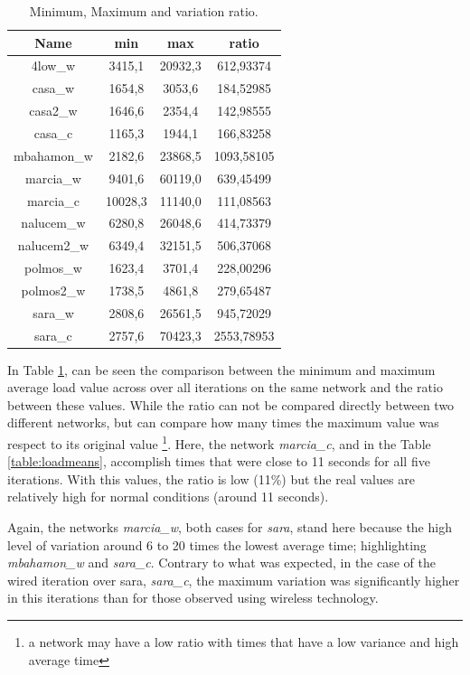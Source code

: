 \begin{table}[ht]
\begin{center}
\begin{tabular}{|c||c|c|c||}
 \hline
Name 			& min		& max		& ratio  	\\ \hline \hline
4low\_w 		& 3415,1	& 20932,3	& 612,93374 \\ \hline 
casa\_w 		& 1654,8	& 3053,6	& 184,52985 \\ \hline 
casa2\_w		& 1646,6	& 2354,4	& 142,98555	\\ \hline 
casa\_c			& 1165,3	& 1944,1	& 166,83258	\\ \hline 
mbahamon\_w		& 2182,6	& 23868,5	& 1093,58105\\ \hline 
marcia\_w		& 9401,6	& 60119,0	& 639,45499	\\ \hline 
marcia\_c		& 10028,3	& 11140,0	& 111,08563	\\ \hline 
nalucem\_w 		& 6280,8	& 26048,6	& 414,73379	\\ \hline 
nalucem2\_w 	& 6349,4	& 32151,5	& 506,37068	\\ \hline 
polmos\_w 		& 1623,4	& 3701,4	& 228,00296	\\ \hline 
polmos2\_w 		& 1738,5	& 4861,8	& 279,65487	\\ \hline 
sara\_w 		& 2808,6	& 26561,5	& 945,72029	\\ \hline 
sara\_c 		& 2757,6	& 70423,3	& 2553,78953\\ \hline 
\end{tabular}
\caption[Page Benchmark: Minimum, Maximum and variation ratio.]{Minimum, Maximum and variation ratio.}
\label{table:varatio}
\end{center}
\end{table}

In Table \ref{table:varatio}, can be seen the comparison between the minimum
and maximum average load value across over all iterations on the same network
and the ratio between these values. While the ratio can not be compared
directly between two different networks, but can compare how many times the
maximum value was respect to its original value \footnote{a network may have a
low ratio with times that have a low variance and high average time}. Here,
the network \emph{marcia\_c}, and in the Table \ref{table:loadmeans},
accomplish times that were close to 11 seconds for all five iterations. With
this values, the ratio is low (11\%) but the real values are relatively high
for normal conditions (around 11 seconds).

Again, the networks \emph{marcia\_w}, both cases for \emph{sara}, stand
here because the high level of variation around 6 to 20 times the lowest
average time; highlighting \emph{mbahamon\_w} and \emph{sara\_c}. Contrary
to what was expected, in the case of the wired iteration over sara,
\emph{sara\_c}, the maximum variation was significantly higher in this
iterations than for those observed using wireless technology.

